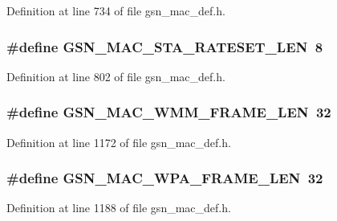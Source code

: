Definition at line 734 of file gsn\_\-mac\_\-def.h.

\hypertarget{a00522_a2aafb0a022ad0aa4856df5c4fa840e0e}{
\subsubsection[{GSN\_\-MAC\_\-STA\_\-RATESET\_\-LEN}]{\setlength{\rightskip}{0pt plus 5cm}\#define GSN\_\-MAC\_\-STA\_\-RATESET\_\-LEN~8}}
\label{a00522_a2aafb0a022ad0aa4856df5c4fa840e0e}


Definition at line 802 of file gsn\_\-mac\_\-def.h.

\hypertarget{a00522_ac8d840ed23118a967d20cbc5fd51dccc}{
\subsubsection[{GSN\_\-MAC\_\-WMM\_\-FRAME\_\-LEN}]{\setlength{\rightskip}{0pt plus 5cm}\#define GSN\_\-MAC\_\-WMM\_\-FRAME\_\-LEN~32}}
\label{a00522_ac8d840ed23118a967d20cbc5fd51dccc}


Definition at line 1172 of file gsn\_\-mac\_\-def.h.

\hypertarget{a00522_ad94df2f86ca411651520f3bc762b1e0b}{
\subsubsection[{GSN\_\-MAC\_\-WPA\_\-FRAME\_\-LEN}]{\setlength{\rightskip}{0pt plus 5cm}\#define GSN\_\-MAC\_\-WPA\_\-FRAME\_\-LEN~32}}
\label{a00522_ad94df2f86ca411651520f3bc762b1e0b}


Definition at line 1188 of file gsn\_\-mac\_\-def.h.



